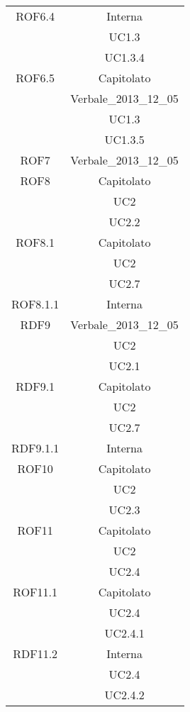 \begin{longtable}{|c|c|}
\midrule
ROF6.4
& Interna\\
& UC1.3\\
& UC1.3.4\\

\midrule
ROF6.5
& Capitolato\\
& Verbale\_2013\_12\_05\\
& UC1.3\\
& UC1.3.5\\




\midrule
ROF7
& Verbale\_2013\_12\_05\\

\midrule
ROF8
& Capitolato\\
& UC2\\
& UC2.2\\

\midrule
ROF8.1
& Capitolato\\
& UC2\\
& UC2.7\\

\midrule
ROF8.1.1
& Interna\\

\midrule
RDF9
& Verbale\_2013\_12\_05\\
& UC2\\
& UC2.1\\

\midrule
RDF9.1
& Capitolato\\
& UC2\\
& UC2.7\\

\midrule
RDF9.1.1
& Interna\\

\midrule
ROF10
& Capitolato\\
& UC2\\
& UC2.3\\

\midrule
ROF11
& Capitolato\\
& UC2\\
& UC2.4\\

\midrule
ROF11.1
& Capitolato\\
& UC2.4\\
& UC2.4.1\\

\midrule
RDF11.2
& Interna\\
& UC2.4\\
& UC2.4.2\\


\end{longtable}

